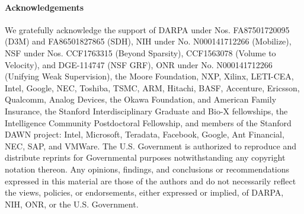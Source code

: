 \documentclass[letterpaper]{article}
\begin{document}
\paragraph*{Acknowledgements}
We gratefully acknowledge the support of DARPA under Nos. FA87501720095 (D3M) and FA86501827865 (SDH), NIH under No. N000141712266 (Mobilize), NSF under Nos. CCF1763315 (Beyond Sparsity), CCF1563078 (Volume to Velocity), and DGE-114747 (NSF GRF), ONR under No. N000141712266 (Unifying Weak Supervision), the Moore Foundation, NXP, Xilinx, LETI-CEA, Intel, Google, NEC, Toshiba, TSMC, ARM, Hitachi, BASF, Accenture, Ericsson, Qualcomm, Analog Devices, the Okawa Foundation, and American Family Insurance, the Stanford Interdisciplinary Graduate and Bio-X fellowships, the Intelligence Community Postdoctoral Fellowship, and members of the Stanford DAWN project: Intel, Microsoft, Teradata, Facebook, Google, Ant Financial, NEC, SAP, and VMWare.
The U.S. Government is authorized to reproduce and distribute reprints for Governmental purposes notwithstanding any copyright notation thereon.
Any opinions, findings, and conclusions or recommendations expressed in this material are those of the authors and do not necessarily reflect the views, policies, or endorsements, either expressed or implied, of DARPA, NIH, ONR, or the U.S. Government. 


\end{document}
